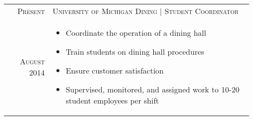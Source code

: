%
%
%
\begin{longtable}{R{\leftcolumn}|p{\rightcolumnlength}}
  \textsc{Present}    & \textsc{University of Michigan Dining | Student Coordinator}   								\\
  \textsc{August 2014}    & \begin{minipage}[t]{\rightcolumnlength}
\begin{itemize}
\item Coordinate the operation of a dining hall
\item Train students on dining hall procedures
\item Ensure customer satisfaction
\item Supervised, monitored, and assigned work to 10-20 student employees per shift
\end{itemize}
                   \end{minipage}										
  \end{longtable}

